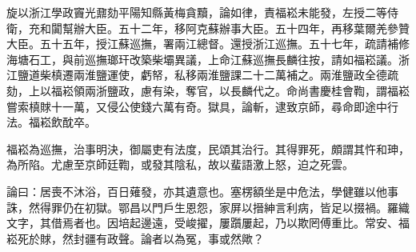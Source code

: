 \begin{pinyinscope}
旋以浙江學政竇光鼐劾平陽知縣黃梅貪黷，論如律，責福崧未能發，左授二等侍衛，充和闐幫辦大臣。五十二年，移阿克蘇辦事大臣。五十四年，再移葉爾羌參贊大臣。五十五年，授江蘇巡撫，署兩江總督。還授浙江巡撫。五十七年，疏請補修海塘石工，與前巡撫瑯玕改築柴壩異議，上命江蘇巡撫長麟往按，請如福崧議。浙江鹽道柴槙遷兩淮鹽運使，虧帑，私移兩淮鹽課二十二萬補之。兩淮鹽政全德疏劾，上以福崧領兩浙鹽政，慮有染，奪官，以長麟代之。命尚書慶桂會鞫，謂福崧嘗索槙賕十一萬，又侵公使錢六萬有奇。獄具，論斬，逮致京師，尋命即途中行法。福崧飲酖卒。

福崧為巡撫，治事明決，御屬吏有法度，民頌其治行。其得罪死，頗謂其忤和珅，為所陷。尤慮至京師廷鞫，或發其陰私，故以蜚語激上怒，迫之死雲。

論曰：居喪不沐浴，百日薙發，亦其遺意也。塞楞額坐是中危法，學健雖以他事誅，然得罪仍在初獄。鄂昌以門戶生恩怨，家屏以搢紳言利病，皆足以掇禍。羅織文字，其借焉者也。因培起邊遠，受峻擢，屢躓屢起，乃以欺罔傅重比。常安、福崧死於賕，然封疆有政聲。論者以為冤，事或然歟？


\end{pinyinscope}